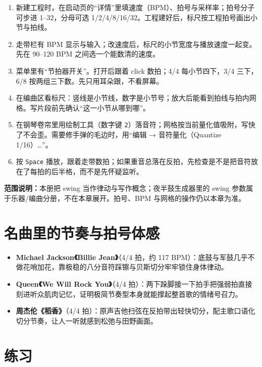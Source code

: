 \begin{enumerate}
  \item 新建工程时，在启动页的“详情”里填速度（BPM）、拍号与采样率；拍号分子可步进 1–32，分母可选 1/2/4/8/16/32。工程建好后，标尺按工程拍号画出小节与拍线。
  \item 走带栏有 BPM 显示与输入；改速度后，标尺的小节宽度与播放速度一起变。先在 90–120 BPM 之间选一个能数清的速度。
  \item 菜单里有“节拍器开关”。打开后跟着 click 数拍；4/4 每小节四下，3/4 三下，6/8 按两组三下数。先只用耳朵跟，不看屏幕。
  \item 在编曲区看标尺：竖线是小节线，数字是小节号；放大后能看到拍线与拍内网格。写片段前先确认“这一小节从哪到哪”。
  \item 在钢琴卷帘里用绘制工具（数字键 \texttt{2}）落音符；网格按当前量化值吸附，写快了不会歪。需要修手弹的毛边时，用“编辑 → 音符量化（Quantize 1/16）…”。
  \item 按 \texttt{Space} 播放，跟着走带数拍；如果重音总落在反拍，先检查是不是把音符放在了每拍的后半格，而不是先怀疑监听。
\end{enumerate}


\textbf{范围说明：}本册把 swing 当作律动与写作概念；夜半鼓生成器里的 swing 参数属于乐器/编曲分册，不在本章展开。拍号、BPM 与网格的操作仍以本章为准。

\section{名曲里的节奏与拍号体感}

\begin{itemize}
  \item \textbf{Michael Jackson《Billie Jean》}（4/4 拍，约 117 BPM）：底鼓与军鼓几乎不做花哨加花，靠极稳的八分音符踩镲与贝斯切分牢牢锁住身体律动。
  \item \textbf{Queen《We Will Rock You》}（4/4 拍）：两下跺脚接一下拍手把强弱拍直接刻进听众肌肉记忆，证明极简节奏型本身就能撑起整首歌的情绪号召力。
  \item \textbf{周杰伦《稻香》}（4/4 拍）：原声吉他扫弦在反拍带出轻快切分，配主歌口语化切分节奏，让人一听就感到松弛与田野画面。
\end{itemize}

\section{练习}


